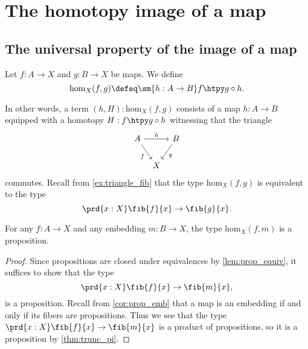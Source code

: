 \chapter{The homotopy image of a map}\label{chap:image}
\section{The universal property of the image of a map}

\begin{defn}
Let $f:A\to X$ and $g:B\to X$ be maps. We define
\begin{equation*}
\mathrm{hom}_X(f,g)\defeq\sm{h:A\to B}f\htpy g\circ h.
\end{equation*}
\end{defn}

\begin{rmk}
In other words, a term $(h,H):\mathrm{hom}_X(f,g)$ consists of a map $h:A\to B$ equipped with a homotopy $H:f\htpy g\circ h$ witnessing that the triangle
\begin{equation*}
\begin{tikzcd}[column sep=tiny]
A \arrow[rr,"h"] \arrow[dr,swap,"f"] & & B \arrow[dl,"g"] \\
& X
\end{tikzcd}
\end{equation*}
commutes. Recall from \cref{ex:triangle_fib} that the type $\mathrm{hom}_X(f,g)$ is equivalent to the type
\begin{equation*}
\prd{x:X}\fib{f}{x}\to\fib{g}{x}.
\end{equation*}
\end{rmk}

\begin{lem}
For any $f:A\to X$ and any embedding $m:B\to X$, the type $\mathrm{hom}_X(f,m)$ is a proposition.
\end{lem}

\begin{proof}
Since propositions are closed under equivalences by \cref{lem:prop_equiv}, it suffices to show that the type
\begin{equation*}
\prd{x:X}\fib{f}{x}\to\fib{m}{x},
\end{equation*}
is a proposition. Recall from \cref{cor:prop_emb} that a map is an embedding if and only if its fibers are propositions.
Thus we see that the type $\prd{x:X}\fib{f}{x}\to\fib{m}{x}$ is a product of propositions, so it is a proposition by \cref{thm:trunc_pi}.
\end{proof}

